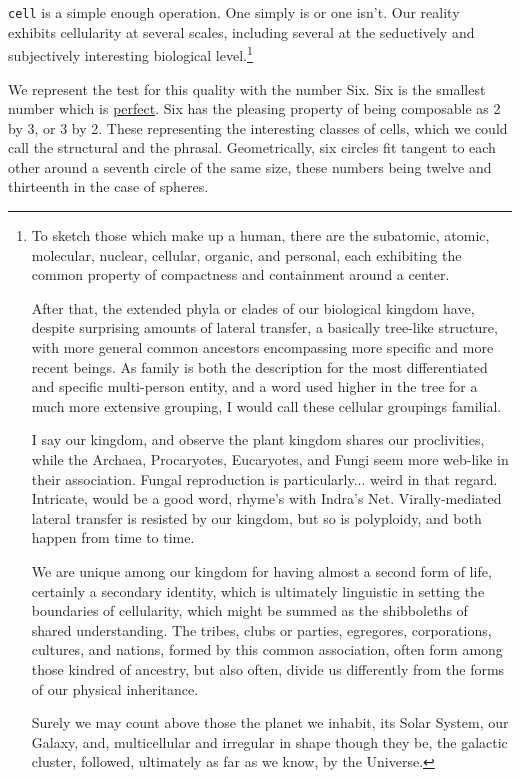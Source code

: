 \documentclass[twoside]{article}
\begin{document}
\texttt{cell} is a simple enough operation. One simply is or one isn't. Our reality exhibits cellularity at several scales, including several at the seductively and subjectively interesting biological level.\footnote{To sketch those which make up a human, there are the subatomic, atomic, molecular, nuclear, cellular, organic, and personal, each exhibiting the common property of compactness and containment around a center.

After that, the extended phyla or clades of our biological kingdom have, despite surprising amounts of lateral transfer, a basically tree-like structure, with more general common ancestors encompassing more specific and more recent beings. As family is both the description for the most differentiated and specific multi-person entity, and a word used higher in the tree for a much more extensive grouping, I would call these cellular groupings familial.

I say our kingdom, and observe the plant kingdom shares our proclivities, while the Archaea, Procaryotes, Eucaryotes, and Fungi seem more web-like in their association. Fungal reproduction is particularly... weird in that regard. Intricate, would be a good word, rhyme's with Indra's Net. Virally-mediated lateral transfer is resisted by our kingdom, but so is polyploidy, and both happen from time to time.

We are unique among our kingdom for having almost a second form of life, certainly a secondary identity, which is ultimately linguistic in setting the boundaries of cellularity, which might be summed as the shibboleths of shared understanding. The tribes, clubs or parties, egregores, corporations, cultures, and nations, formed by this common association, often form among those kindred of ancestry, but also often, divide us differently from the forms of our physical inheritance.

Surely we may count above those the planet we inhabit, its Solar System, our Galaxy, and, multicellular and irregular in shape though they be, the galactic cluster, followed, ultimately as far as we know, by the Universe.}

We represent the test for this quality with the number Six.  Six is the smallest number which is \href{https://en.wikipedia.org/wiki/Perfect_number}{perfect}.  Six has the pleasing property of being composable as 2 by 3, or 3 by 2. These representing the interesting classes of cells, which we could call the structural and the phrasal. Geometrically, six circles fit tangent to each other around a seventh circle of the same size, these numbers being twelve and thirteenth in the case of spheres.
\end{document}
